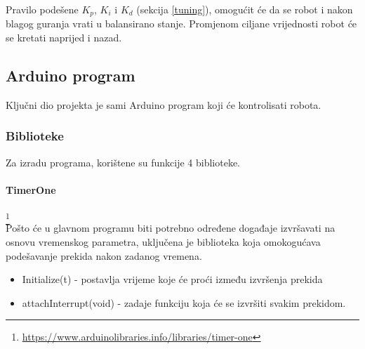 \documentclass[../Document.tex]{subfiles}
\begin{document}

\noindent Pravilo podešene $K_p$, $K_i$ i $K_d$ (sekcija \ref{tuning}), omogućit će da se robot i nakon blagog guranja vrati u balansirano stanje. Promjenom ciljane vrijednosti robot će se kretati naprijed i nazad.

\subsection{Arduino program}
Ključni dio projekta je sami Arduino program koji će kontrolisati robota.

\subsubsection{Biblioteke}
Za izradu programa, korištene su funkcije 4 biblioteke.


\paragraph{TimerOne}\footnote{\url{https://www.arduinolibraries.info/libraries/timer-one}\mbox{}}\\
\noindent Pošto će u glavnom programu biti potrebno određene događaje izvršavati na osnovu vremenskog parametra, uključena je biblioteka koja omokogućava podešavanje prekida nakon zadanog vremena.
\begin{itemize}
    \item Initialize(t) - postavlja vrijeme koje će proći između izvršenja prekida
    \item attachInterrupt(void) - zadaje funkciju koja će se izvršiti svakim prekidom.
\end{itemize}
\end{document}

